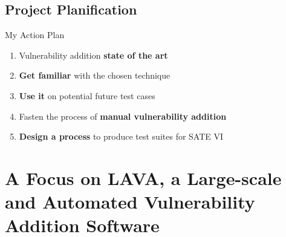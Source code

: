 \documentclass[aspectratio=169]{beamer}
\begin{document}
  \subsection{Project Planification}
  \begin{frame}{My Action Plan}
    \begin{enumerate}
      \setlength\itemsep{1em}
      \item Vulnerability addition \textbf{state of the art}
      \pause
      \item \textbf{Get familiar} with the chosen technique
      \pause
      \item \textbf{Use it} on potential future test cases
      \pause
      \item Fasten the process of \textbf{manual vulnerability addition}
      \pause
      \item \textbf{Design a process} to produce test suites for SATE VI
    \end{enumerate}
  \end{frame}

  \section{A Focus on LAVA, a Large-scale and Automated Vulnerability Addition Software}
\end{document}
